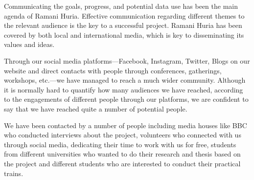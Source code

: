 \documentclass[a4paper,12pt,twoside]{article}
\begin{document}
Communicating the goals, progress, and potential data use has been the main agenda of Ramani Huria. Effective communication regarding different themes to the relevant audience is the key to a successful project. Ramani Huria has been covered by both local and international media, which is key to disseminating its values and ideas. 

Through our social media platforms---Facebook, Instagram, Twitter, Blogs on our website and direct contacts with people through conferences, gatherings, workshops, etc.---we have managed to reach a much wider community. Although it is normally hard to quantify how many audiences we have reached, according to the engagements of different people through our platforms, we are confident to say that we have reached quite a number of potential people.

We have been contacted by a number of people including media houses like BBC who conducted interviews about the project, volunteers who connected with us through social media, dedicating their time to work with us for free, students from different universities who wanted to do their research and thesis based on the project and different students who are interested to conduct their practical trains.



\end{document}
